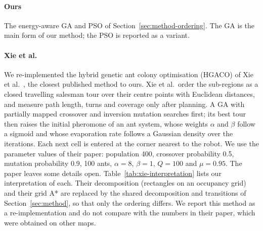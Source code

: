 \paragraph{Ours}
The energy-aware GA and PSO of Section~\ref{sec:method-ordering}.
The GA is the main form of our method; the PSO is reported as a variant.

\paragraph{Xie et al.}
We re-implemented the hybrid genetic ant colony optimisation (HGACO) of Xie et al.\ \cite{xieHybridGeneticAnt2024}, the closest published method to ours.
Xie et al.\ order the sub-regions as a closed travelling salesman tour over their centre points with Euclidean distances, and measure path length, turns and coverage only after planning.
A GA with partially mapped crossover \cite{goldbergAllelesLociTraveling1985} and inversion mutation searches first; its best tour then raises the initial pheromone of an ant system, whose weights $\alpha$ and $\beta$ follow a sigmoid and whose evaporation rate follows a Gaussian density over the iterations.
Each next cell is entered at the corner nearest to the robot.
We use the parameter values of their paper: population 400, crossover probability 0.5, mutation probability 0.9, 100 ants, $\alpha = 8$, $\beta = 1$, $Q = 100$ and $\mu = 0.95$.
The paper leaves some details open.
Table~\ref{tab:xie-interpretation} lists our interpretation of each.
Their decomposition (rectangles on an occupancy grid) and their grid A* are replaced by the shared decomposition and transitions of Section~\ref{sec:method}, so that only the ordering differs.
We report this method as a re-implementation and do not compare with the numbers in their paper, which were obtained on other maps.

